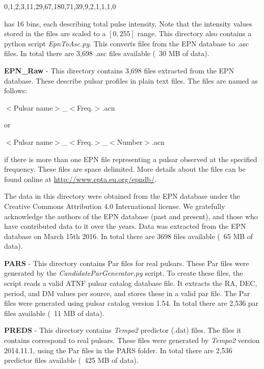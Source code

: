 \documentclass[preprint,authoryear,5p,twocolumn]{elsarticle_mod}
\begin{document}
0,1,2,3,11,29,67,180,71,39,9,2,1,1,1,0 \newline

has 16 bins, each describing total pulse intensity. Note that the intensity values stored in the files are scaled to a $[0,255]$ range. This directory also contains a python script \textit{EpnToAsc.py}. This converts files from the EPN database to .asc files. In total there are 3,698 .asc files available (~30 MB of data).\newline
 
\textbf{EPN\_Raw} -  This directory contains 3,698 files extracted from the EPN database. These describe pulsar profiles in plain text files. The files are named as follows:\newline

$<$Pulsar name$>$\_$<$Freq.$>$.acn \newline

or 

$<$Pulsar name$>$\_$<$Freq.$>$\_$<$Number$>$.acn \newline

if there is more than one EPN file representing a pulsar observed at the specified frequency. These files are space delimited. More details about the files can be found online at \url{http://www.epta.eu.org/epndb/}.\newline

The data in this directory were obtained from the EPN database under the Creative Commons Attribution 4.0 International license. We gratefully acknowledge the authors of the EPN database (past and present), and those who have contributed data to it over the years.  Data was extracted from the EPN database on March 15th 2016. In total there are 3698 files available (~65 MB of data).\newline
 
\textbf{PARS} - This directory contains Par files for real pulsars. These Par files were generated by the \textit{CandidateParGenerator.py} script. To create these files, the script reads a valid ATNF pulsar catalog database file. It extracts the RA, DEC, period, and DM values per source, and stores these in a valid par file. The Par files were generated using pulsar catalog version 1.54. In total there are 2,536 par files available (~11 MB of data).\newline
 
\textbf{PREDS} - This directory contains \textit{Tempo2} predictor (.dat) files. The files it contains correspond to real pulsars. These files were generated by \textit{Tempo2} version 2014.11.1, using the Par files in the PARS folder. In total there are 2,536 predictor files available (~425 MB of data).\newline
\end{document}
